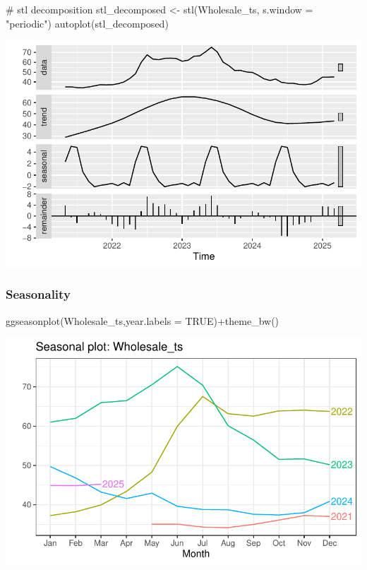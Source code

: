 \documentclass[
  letterpaper,
  DIV=11,
  numbers=noendperiod]{scrartcl}
\newenvironment{Shaded}{\begin{snugshade}}{\end{snugshade}}
\newcommand{\AttributeTok}[1]{\textcolor[rgb]{0.40,0.45,0.13}{#1}}
\newcommand{\CommentTok}[1]{\textcolor[rgb]{0.37,0.37,0.37}{#1}}
\newcommand{\ConstantTok}[1]{\textcolor[rgb]{0.56,0.35,0.01}{#1}}
\newcommand{\FunctionTok}[1]{\textcolor[rgb]{0.28,0.35,0.67}{#1}}
\newcommand{\NormalTok}[1]{\textcolor[rgb]{0.00,0.23,0.31}{#1}}
\newcommand{\OtherTok}[1]{\textcolor[rgb]{0.00,0.23,0.31}{#1}}
\newcommand{\SpecialCharTok}[1]{\textcolor[rgb]{0.37,0.37,0.37}{#1}}
\newcommand{\StringTok}[1]{\textcolor[rgb]{0.13,0.47,0.30}{#1}}
\begin{document}
\begin{Shaded}
\begin{Highlighting}[]
\CommentTok{\# stl decomposition}
\NormalTok{stl\_decomposed }\OtherTok{\textless{}{-}} \FunctionTok{stl}\NormalTok{(Wholesale\_ts, }\AttributeTok{s.window =} \StringTok{"periodic"}\NormalTok{)}
\FunctionTok{autoplot}\NormalTok{(stl\_decomposed)}
\end{Highlighting}
\end{Shaded}

\includegraphics{Maize_analysis_files/figure-pdf/unnamed-chunk-19-1.pdf}

\subsubsection{Seasonality}\label{seasonality}

\begin{Shaded}
\begin{Highlighting}[]
\FunctionTok{ggseasonplot}\NormalTok{(Wholesale\_ts,}\AttributeTok{year.labels =} \ConstantTok{TRUE}\NormalTok{)}\SpecialCharTok{+}\FunctionTok{theme\_bw}\NormalTok{()}
\end{Highlighting}
\end{Shaded}

\includegraphics{Maize_analysis_files/figure-pdf/unnamed-chunk-20-1.pdf}
\end{document}
